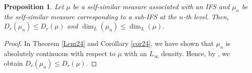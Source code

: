 \documentclass{amsproc}
\newtheorem{proposition}[theorem]{Proposition}
\theoremstyle{definition}
\newtheorem{example}[theorem]{Example}
\theoremstyle{remark}
\numberwithin{equation}{section}
\begin{document}
\begin{proposition}
 Let $\mu$ be a self-similar measure associated with an IFS and $\mu_n$ be the self-similar measure corresponding to a sub-IFS at the $n$-th level. Then, $D_r(\mu_n) \le D_r(\mu)$ and $\dim_L(\mu_n) \le \dim_L(\mu).$
\end{proposition}
\begin{proof}
In Theorem \ref{Lem24} and Corollary \ref{cor24}, we have shown that $\mu_n$ is absolutely continuous with respect to $\mu$ with an $L_{\infty}$ density. Hence, by \cite[Theorem 3.4]{VAD}, we obtain $D_r(\mu_n) \le D_r(\mu).$

  
  
\end{proof}
\end{document}
